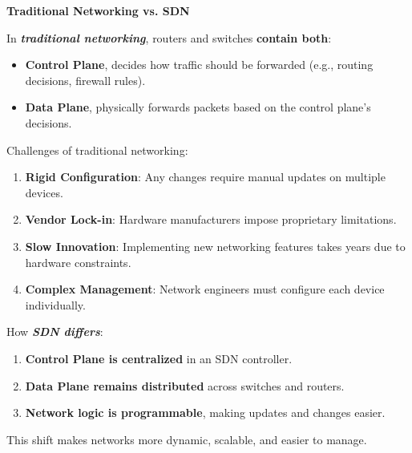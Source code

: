 \highspace
\begin{flushleft}
    \textcolor{Green3}{ \textbf{Traditional Networking vs. SDN}}
\end{flushleft}
In \emph{\textbf{traditional networking}}, routers and switches \textbf{contain both}:
\begin{itemize}
    \item \textbf{Control Plane}, decides how traffic should be forwarded (e.g., routing decisions, firewall rules).
    \item \textbf{Data Plane}, physically forwards packets based on the control plane's decisions.
\end{itemize}
Challenges of traditional networking:
\begin{enumerate}[label=\textcolor{Red2}{\alph*.}]
    \item \textcolor{Red2}{ \textbf{Rigid Configuration}}: Any changes require manual updates on multiple devices.
    \item \textcolor{Red2}{ \textbf{Vendor Lock-in}}: Hardware manufacturers impose proprietary limitations.
    \item \textcolor{Red2}{ \textbf{Slow Innovation}}: Implementing new networking features takes years due to hardware constraints.
    \item \textcolor{Red2}{ \textbf{Complex Management}}: Network engineers must configure each device individually.
\end{enumerate}
How \emph{\textbf{SDN differs}}:
\begin{enumerate}[label=\textcolor{Green3}{\alph*.}]
    \item \textcolor{Green3}{ \textbf{Control Plane is centralized}} in an SDN controller.
    \item \textcolor{Green3}{ \textbf{Data Plane remains distributed}} across switches and routers.
    \item \textcolor{Green3}{ \textbf{Network logic is programmable}}, making updates and changes easier.
\end{enumerate}
This shift makes networks more dynamic, scalable, and easier to manage.